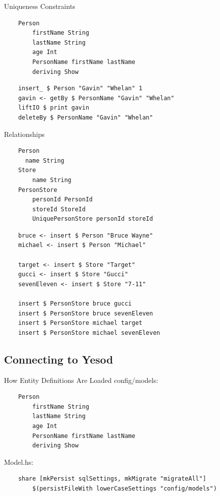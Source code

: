 \documentclass[pdf]{beamer}
\begin{document}
\begin{frame}[fragile]{Uniqueness Constraints}
  \begin{verbatim}
    Person
        firstName String
        lastName String
        age Int
        PersonName firstName lastName
        deriving Show
  \end{verbatim}
  \pause
  \begin{verbatim}
    insert_ $ Person "Gavin" "Whelan" 1
    gavin <- getBy $ PersonName "Gavin" "Whelan"
    liftIO $ print gavin
    deleteBy $ PersonName "Gavin" "Whelan"
  \end{verbatim}
\end{frame}

\begin{frame}[fragile]{Relationships}
  \begin{verbatim}
    Person
      name String
    Store
        name String
    PersonStore
        personId PersonId
        storeId StoreId
        UniquePersonStore personId storeId
  \end{verbatim}
  \pause
  \begin{verbatim}
    bruce <- insert $ Person "Bruce Wayne"
    michael <- insert $ Person "Michael"

    target <- insert $ Store "Target"
    gucci <- insert $ Store "Gucci"
    sevenEleven <- insert $ Store "7-11"

    insert $ PersonStore bruce gucci
    insert $ PersonStore bruce sevenEleven
    insert $ PersonStore michael target
    insert $ PersonStore michael sevenEleven
  \end{verbatim}
\end{frame}

\subsection{Connecting to Yesod}
\begin{frame}[fragile]{How Entity Definitions Are Loaded}
  config/models:
  \begin{verbatim}
    Person
        firstName String
        lastName String
        age Int
        PersonName firstName lastName
        deriving Show
  \end{verbatim}
  Model.hs:
  \begin{verbatim}
    share [mkPersist sqlSettings, mkMigrate "migrateAll"]
        $(persistFileWith lowerCaseSettings "config/models")
  \end{verbatim}
\end{frame}
\end{document}
